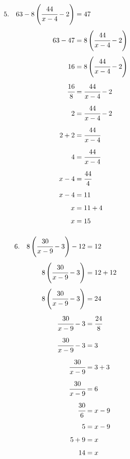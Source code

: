 \documentclass{article}
\begin{document}
\noindent
\begin{minipage}[t]{0.5000\textwidth}
\begin{align*}
5.\hspace{10pt}63-8\left(\cfrac{44}{x-4}-2\right)&=47\\[4pt]
63-47&=8\left(\cfrac{44}{x-4}-2\right)\\[4pt]
16&=8\left(\cfrac{44}{x-4}-2\right)\\[4pt]
\cfrac{16}{8}&=\cfrac{44}{x-4}-2\\[4pt]
2&=\cfrac{44}{x-4}-2\\[4pt]
2+2&=\cfrac{44}{x-4}\\[4pt]
4&=\cfrac{44}{x-4}\\[4pt]
x-4&=\cfrac{44}{4}\\[4pt]
x-4&=11\\[4pt]
x&=11+4\\[4pt]
x&=15\\[4pt]
\end{align*}
\end{minipage}
\begin{minipage}[t]{0.5000\textwidth}
\begin{align*}
6.\hspace{10pt}8\left(\cfrac{30}{x-9}-3\right)-12&=12\\[4pt]
8\left(\cfrac{30}{x-9}-3\right)&=12+12\\[4pt]
8\left(\cfrac{30}{x-9}-3\right)&=24\\[4pt]
\cfrac{30}{x-9}-3&=\cfrac{24}{8}\\[4pt]
\cfrac{30}{x-9}-3&=3\\[4pt]
\cfrac{30}{x-9}&=3+3\\[4pt]
\cfrac{30}{x-9}&=6\\[4pt]
\cfrac{30}{6}&=x-9\\[4pt]
5&=x-9\\[4pt]
5+9&=x\\[4pt]
14&=x\\[4pt]
\end{align*}
\end{minipage}
\vspace{10 mm}
\end{document}
